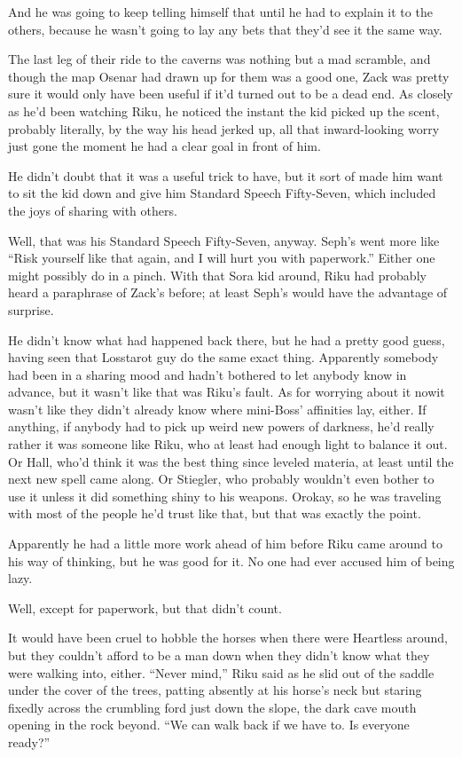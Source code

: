 And he was going to keep telling himself that until he had to explain it to the others, because he wasn't going to lay any bets that they'd see it the same way.


\scenechange


The last leg of their ride to the caverns was nothing but a mad scramble, and though the map Osenar had drawn up for them was a good one, Zack was pretty sure it would only have been useful if it'd turned out to be a dead end. As closely as he'd been watching Riku, he noticed the instant the kid picked up the scent, probably literally, by the way his head jerked up, all that inward-looking worry just gone the moment he had a clear goal in front of him.

He didn't doubt that it was a useful trick to have, but it sort of made him want to sit the kid down and give him Standard Speech Fifty-Seven, which included the joys of sharing with others.

Well, that was his Standard Speech Fifty-Seven, anyway. Seph's went more like ``Risk yourself like that again, and I will hurt you with paperwork.'' Either one might possibly do in a pinch. With that Sora kid around, Riku had probably heard a paraphrase of Zack's before; at least Seph's would have the advantage of surprise.

He didn't know what had happened back there, but he had a pretty good guess, having seen that Losstarot guy do the same exact thing. Apparently somebody had been in a sharing mood and hadn't bothered to let anybody know in advance, but it wasn't like that was Riku's fault. As for worrying about it now\textemdash it wasn't like they didn't already know where mini-Boss' affinities lay, either. If anything, if anybody had to pick up weird new powers of darkness, he'd really rather it was someone like Riku, who at least had enough light to balance it out. Or Hall, who'd think it was the best thing since leveled materia, at least until the next new spell came along. Or Stiegler, who probably wouldn't even bother to use it unless it did something shiny to his weapons. Or\textemdash okay, so he was traveling with most of the people he'd trust like that, but that was exactly the point.

Apparently he had a little more work ahead of him before Riku came around to his way of thinking, but he was good for it. No one had ever accused him of being lazy.

Well, except for paperwork, but that didn't count.

It would have been cruel to hobble the horses when there were Heartless around, but they couldn't afford to be a man down when they didn't know what they were walking into, either. ``Never mind,'' Riku said as he slid out of the saddle under the cover of the trees, patting absently at his horse's neck but staring fixedly across the crumbling ford just down the slope, the dark cave mouth opening in the rock beyond. ``We can walk back if we have to. Is everyone ready?''


